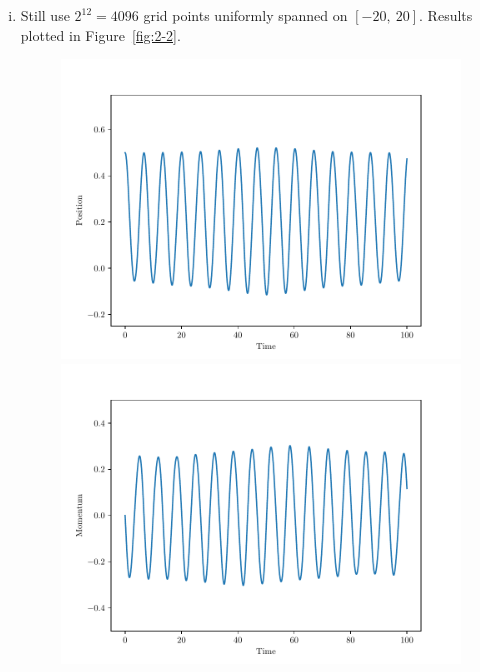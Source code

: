 \documentclass{article}
\begin{document}
\begin{enumerate}[1.]
\begin{enumerate}[(i)]
    \item Still use $2^{12} = 4096$ grid points uniformly spanned on $[-20,\ 20]$.  Results plotted in Figure~\ref{fig:2-2}.
    \begin{figure}[H]
      \centering
      \begin{minipage}{0.32\linewidth}
        \centering
        \includegraphics[width=\linewidth]{q2-2_time_position.pdf}
      \end{minipage}
      \begin{minipage}{0.32\linewidth}
        \centering
        \includegraphics[width=\linewidth]{q2-2_time_momentum.pdf}
      \end{minipage}
      \begin{minipage}{0.32\linewidth}

\end{minipage}
\end{figure}
\end{enumerate}
\end{enumerate}
\end{document}
